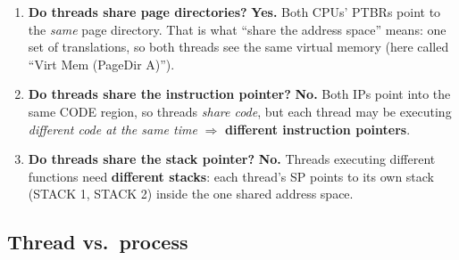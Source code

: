 \documentclass[11pt,a4paper]{article}
\begin{document}
\begin{center}
\end{center}

\begin{enumerate}
  \item \textbf{Do threads share page directories?} \textbf{Yes.} Both
        CPUs' PTBRs point to the \emph{same} page directory. That is what
        ``share the address space'' means: one set of translations, so both
        threads see the same virtual memory (here called ``Virt Mem
        (PageDir A)'').
  \item \textbf{Do threads share the instruction pointer?} \textbf{No.}
        Both IPs point into the same CODE region, so threads \emph{share
        code}, but each thread may be executing \emph{different code at the
        same time} \(\Rightarrow\) \textbf{different instruction pointers}.
  \item \textbf{Do threads share the stack pointer?} \textbf{No.} Threads
        executing different functions need \textbf{different stacks}: each
        thread's SP points to its own stack (STACK 1, STACK 2) inside the
        one shared address space.
\end{enumerate}

\subsection{Thread vs.\ process}
\end{document}
